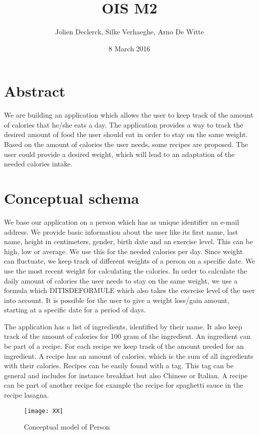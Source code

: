 \documentclass{article}
\title{OIS M2}
\author{Jolien Declerck, Silke Verhaeghe, Arno De Witte}
\date{8 March 2016}
\begin{document}
\maketitle

\section{Abstract}
We are building an application which allows the user to keep track of the amount of calories that he/she eats a day.  The application provides a way to track the desired amount of food the user should eat in order to stay on the same weight. Based on the amount of calories the user needs, some recipes are proposed. The user could provide a desired weight, which will lead to an adaptation of the needed calories intake.


\section{Conceptual schema}
We base our application on a person which has as unique identifier an e-mail address. We provide basic information about the user like its first name, last name, height in centimeters, gender, birth date and an exercise level. This can be high, low or average. We use this for the needed calories per day. Since weight can fluctuate, we keep track of different weights of a person on a specific date. We use the most recent weight for calculating the calories. In order to calculate the daily amount of calories the user needs to stay on the same weight, we use a formula which DITISDEFORMULE which also takes the exercise level of the user into account. It is possible for the user to give a weight loss/gain amount, starting at a specific date for a period of days. 

The application has a list of ingredients, identified by their name. It also keep track of the amount of calories for 100 gram of the ingredient. An ingredient can be part of a recipe. For each recipe we keep track of the amount needed for an ingredient. A recipe has an amount of calories, which is the sum of all ingredients with their calories. Recipes can be easily found with a tag. This tag can be general and includes for instance breakfast but also Chinese or Italian. A recipe can be part of another recipe for example the recipe for spaghetti sauce in the recipe lasagna.  
\begin{figure}[H]
\centering
\texttt{[image: XX]}
\caption{Conceptual model of Person}
\end{figure}
\end{document}
